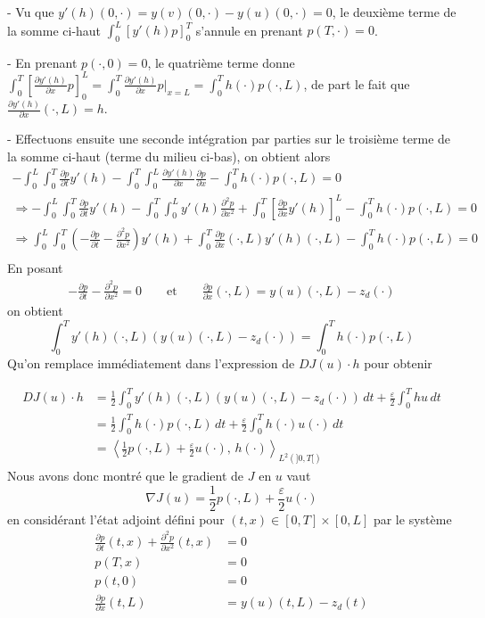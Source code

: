 \documentclass[
	french,
	11pt, %
]{fphw}
\begin{document}
- Vu que $y'(h)(0, \cdot) = y(v)(0, \cdot)- y(u)(0, \cdot) = 0$, le deuxième terme de la somme ci-haut $\int_0^L \left[ y'(h)p \right]_0^T $ s'annule en prenant $p(T, \cdot) = 0$. 

- En prenant $p(\cdot, 0) = 0$, le quatrième terme donne $\int_0^T \left[ \frac{\partial y'(h)}{\partial x}p \right]_0^L = \int_0^T \frac{\partial y'(h)}{\partial x}p\big\rvert_{x=L} = \int_0^T h(\cdot)p(\cdot,L)$, de part le fait que $\frac{\partial y'(h)}{\partial x}(\cdot,L) = h$.

- Effectuons ensuite une seconde intégration par parties sur le troisième terme de la somme ci-haut (terme du milieu ci-bas), on obtient alors
\begin{align*}
	- \int_0^L \int_0^T \frac{\partial p}{\partial t} y'(h) -\int_0^T \int_0^L \frac{\partial y'(h)}{\partial x} \frac{\partial p}{\partial x} - \int_0^T h(\cdot)p(\cdot,L) = 0 \\
	\Longrightarrow - \int_0^L \int_0^T \frac{\partial p}{\partial t} y'(h) - \int_0^T \int_0^L y'(h) \frac{\partial^2 p}{\partial x^2} + \int_0^T \left[ \frac{\partial p}{\partial x} y'(h)\right]_0^L - \int_0^T h(\cdot)p(\cdot,L) = 0 \\
	\Longrightarrow \int_0^L \int_0^T \left(-\frac{\partial p}{\partial t} - \frac{\partial^2 p}{\partial x^2} \right) y'(h) + \int_0^T \frac{\partial p}{\partial x}(\cdot,L) y'(h)(\cdot,L) - \int_0^T h(\cdot)p(\cdot,L) = 0 \\
\end{align*}
En posant
\begin{align*}
	-\frac{\partial p}{\partial t} - \frac{\partial^2 p}{\partial x^2} = 0 \qquad \text{et} \qquad
	\frac{\partial p}{\partial x}(\cdot,L) = y(u)(\cdot,L) - z_d(\cdot)
\end{align*}
on obtient 
$$
\int_0^T y'(h)(\cdot,L) \left( y(u)(\cdot,L) - z_d(\cdot) \right) = \int_0^T h(\cdot)p(\cdot,L)
$$
Qu'on remplace immédiatement dans l'expression de $DJ(u)\cdot h$ pour obtenir

\begin{align*}
DJ(u)\cdot h &=  \frac{1}{2} \int_0^T y'(h)(\cdot,L) (y(u)(\cdot,L) - z_d(\cdot))\,dt + \frac{\varepsilon}{2} \int_0^T h u\,dt \\
&= \frac{1}{2} \int_0^T h(\cdot)p(\cdot,L)\,dt + \frac{\varepsilon}{2} \int_0^T h(\cdot) u(\cdot)\,dt \\
&= \left\langle  \frac{1}{2} p(\cdot,L) + \frac{\varepsilon}{2}u(\cdot),\, h(\cdot)  \right\rangle_{L^2(]0,T[)}
\end{align*}
Nous avons donc montré que le gradient de $J$ en $u$ vaut 
$$
\nabla J(u) = \frac{1}{2} p(\cdot,L) + \frac{\varepsilon}{2}u(\cdot)
$$
en considérant l'état adjoint défini pour $(t,x) \in [0,T]\times[0,L]$ par le système
\begin{align*}
	\frac{\partial p}{\partial t} (t,x) + \frac{\partial^2 p}{\partial x^2} (t,x) &= 0 \\
	p(T,x) &= 0 \\
	p(t,0) &= 0  \\
	\frac{\partial p}{\partial x} (t,L) &= y(u)(t,L) - z_d(t)
\end{align*} 

\end{document}
